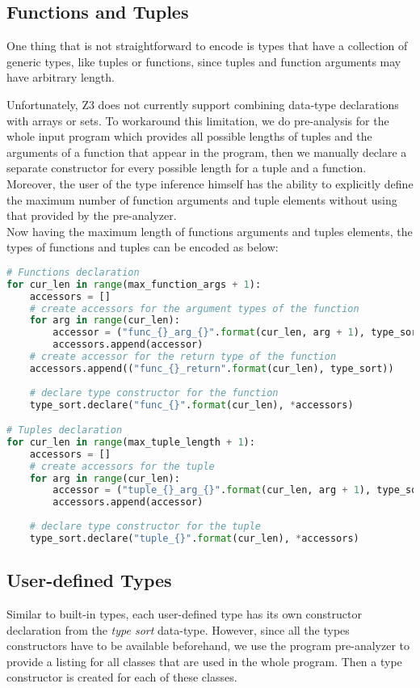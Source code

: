 \subsection{Functions and Tuples}
One thing that is not straightforward to encode is types that have a collection of generic types, like tuples or functions, since tuples and function arguments may have arbitrary length.

Unfortunately, Z3 does not currently support combining data-type declarations with arrays or sets. To workaround this limitation, we do pre-analysis for the whole input program which provides all possible lengths of tuples and the arguments of a function that appear in the program, then we manually declare a separate constructor for every possible length for a tuple and a function. Moreover, the user of the type inference himself has the ability to explicitly define the maximum number of function arguments and tuple elements without using that provided by the pre-analyzer.\\

Now having the maximum length of functions arguments and tuples elements, the types of functions and tuples can be encoded as below:

\begin{lstlisting}[language=python]
# Functions declaration
for cur_len in range(max_function_args + 1):
    accessors = []
    # create accessors for the argument types of the function
    for arg in range(cur_len):
	    accessor = ("func_{}_arg_{}".format(cur_len, arg + 1), type_sort)
	    accessors.append(accessor)
    # create accessor for the return type of the function
    accessors.append(("func_{}_return".format(cur_len), type_sort))
    
    # declare type constructor for the function
    type_sort.declare("func_{}".format(cur_len), *accessors)

# Tuples declaration
for cur_len in range(max_tuple_length + 1):
    accessors = []
    # create accessors for the tuple
    for arg in range(cur_len):
		accessor = ("tuple_{}_arg_{}".format(cur_len, arg + 1), type_sort)
	    accessors.append(accessor)
	    
    # declare type constructor for the tuple
    type_sort.declare("tuple_{}".format(cur_len), *accessors)
\end{lstlisting}

\subsection{User-defined Types}
Similar to built-in types, each user-defined type has its own constructor declaration from the \textit{type sort} data-type. However, since all the types constructors have to be available beforehand, we use the program pre-analyzer to provide a listing for all classes that are used in the whole program. Then a type constructor is created for each of these classes. 

